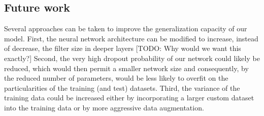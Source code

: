 \documentclass[a4paper]{article}
\begin{document}
\subsection{Future work}
Several approaches can be taken to improve the generalization capacity of our model. First, the neural network architecture can be modified to increase, instead of decrease, the filter size in deeper layers [TODO: Why would we want this exactly?] Second, the very high dropout probability of our network could likely be reduced, which would then permit a smaller network size and consequently, by the reduced number of parameters, would be less likely to overfit on the particularities of the training (and test) datasets. Third, the variance of the training data could be increased either by incorporating a larger custom dataset into the training data or by more aggressive data augmentation.


\end{document}
